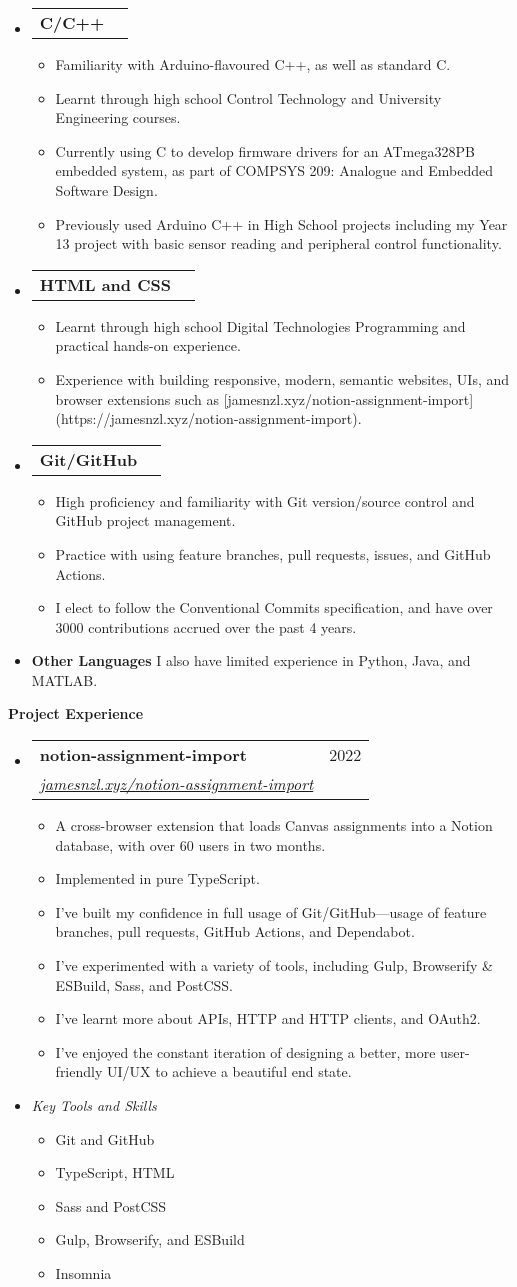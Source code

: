 \documentclass[11pt,a4paper]{article}[leftmargin=*]
\makeatletter
\def \entryspacing {-0pt}
\renewcommand{\section}[2]{\vspace{5pt}
  \colorbox{secondary}{\color{white}\raggedbottom\normalsize\textbf{{#1}{\hspace{7pt}#2}}}
}
\newcommand{\resumeEntryStart}{\begin{itemize}[leftmargin=2.5mm]}
\newcommand{\resumeEntryEnd}{\end{itemize}\vspace{\entryspacing}}
\newcommand{\resumeItemListStart}{\begin{itemize}[leftmargin=4.5mm]}
\newcommand{\resumeItemListEnd}{\end{itemize}}
\newcommand{\resumeItem}[1]{
  \item\small{
    {#1 \vspace{-2pt}}
  }
}
\newcommand{\resumeEntryTSDL}[4]{
  \vspace{-1pt}\item[]
    \begin{tabularx}{0.97\textwidth}{X@{\hspace{60pt}}r}
      \textbf{\color{primary}#1} & {\firabook\color{accent}\small#2} \\
      \textit{\color{accent}\small#3} & \textit{\color{accent}\small#4} \\
    \end{tabularx}\vspace{-6pt}
}
\newcommand{\resumeEntryTD}[2]{
  \vspace{-1pt}\item[]
    \begin{tabularx}{0.97\textwidth}{X@{\hspace{60pt}}r}
      \textbf{\color{primary}#1} & {\firabook\color{accent}\small#2} \\
    \end{tabularx}\vspace{-6pt}
}
\newcommand{\resumeEntryS}[2]{
  \item[]\small{
    \textbf{\color{primary}#1 }{ #2 \vspace{-6pt}}
  }
}
\newcommand{\resumeEntryE}[1]{
  \item[]\small{
    \textit{\color{accent}\small#1 \vspace{-6pt}}
  }\\
}
\makeatother
\begin{document}
\resumeEntryStart
\resumeEntryTD
{C/C++}{}
\resumeItemListStart
\resumeItem {Familiarity with Arduino-flavoured C++, as well as standard C.}
\resumeItem {Learnt through high school Control Technology and University Engineering courses.}
\resumeItem {Currently using C to develop firmware drivers for an ATmega328PB embedded system, as part of COMPSYS 209: Analogue and Embedded Software Design.}
\resumeItem {Previously used Arduino C++ in High School projects including my Year 13 project with basic sensor reading and peripheral control functionality.}
\resumeItemListEnd
\resumeEntryEnd

\resumeEntryStart
\resumeEntryTD
{HTML and CSS}{}
\resumeItemListStart
\resumeItem {Learnt through high school Digital Technologies Programming and practical hands-on experience.}
\resumeItem {Experience with building responsive, modern, semantic websites, UIs, and browser extensions such as [jamesnzl.xyz/notion-assignment-import](https://jamesnzl.xyz/notion-assignment-import).}
\resumeItemListEnd
\resumeEntryEnd

\resumeEntryStart
\resumeEntryTD
{Git/GitHub}{}
\resumeItemListStart
\resumeItem {High proficiency and familiarity with Git version/source control and GitHub project management.}
\resumeItem {Practice with using feature branches, pull requests, issues, and GitHub Actions.}
\resumeItem {I elect to follow the Conventional Commits specification, and have over 3000 contributions accrued over the past 4 years.}
\resumeItemListEnd
\resumeEntryEnd

\resumeEntryStart
\resumeEntryS
{Other Languages}{I also have limited experience in Python, Java, and MATLAB.}
\resumeEntryEnd


\section{\faFlask}{Project Experience}

\resumeEntryStart
\resumeEntryTSDL
{notion-assignment-import}{2022}
{\href{https://jamesnzl.xyz/notion-assignment-import}{jamesnzl.xyz/notion-assignment-import}}{}
\resumeItemListStart
\resumeItem {A cross-browser extension that loads Canvas assignments into a Notion database, with over 60 users in two months.}
\resumeItem {Implemented in pure TypeScript.}
\resumeItem {I've built my confidence in full usage of Git/GitHub—usage of feature branches, pull requests, GitHub Actions, and Dependabot.}
\resumeItem {I've experimented with a variety of tools, including Gulp, Browserify \& ESBuild, Sass, and PostCSS.}
\resumeItem {I’ve learnt more about APIs, HTTP and HTTP clients, and OAuth2.}
\resumeItem {I've enjoyed the constant iteration of designing a better, more user-friendly UI/UX to achieve a beautiful end state.}
\resumeItemListEnd
\resumeEntryE{Key Tools and Skills}
\resumeItemListStart
\resumeItem {Git and GitHub}
\resumeItem {TypeScript, HTML}
\resumeItem {Sass and PostCSS}
\resumeItem {Gulp, Browserify, and ESBuild}
\resumeItem {Insomnia}
\resumeItemListEnd
\resumeEntryEnd
\end{document}
